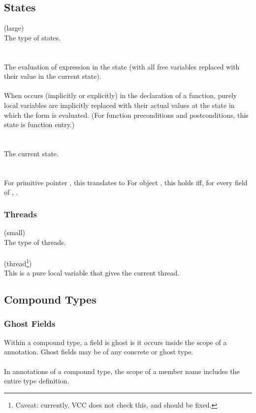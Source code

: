 \documentclass[preprint,nocopyrightspace]{sigplanconf}
\begin{document}
{{{\subsection{States}
\vcc{\state} (large)\\
The type of states. 
\\\\
\\
The evaluation of expression  in the state  (with all
free variables replaced with their value in the current state).  
\\\\
When \vcc{\at} occurs (implicitly or explicitly) in the declaration of
a function, purely local variables are implicitly replaced with their
actual values at the state in which the form is evaluated. (For
function preconditions and postconditions, this state is function entry.)
\\\\
\vcc{\state \now()}\\
The current state. 
\\\\
\\
For primitive pointer , this translates to  
For object , this holds iff, for every field 
of , .

\subsubsection{Threads}
\vcc{\thread} (small) \\
The type of threads. 
\\\\
 (thread\footnote{Caveat: currently, VCC does
not check this, and should be fixed.})\\
This is a pure local variable that gives the current
thread. 

\subsection{Compound Types}
 
\subsubsection{Ghost Fields}
Within a compound type, a field is ghost is it occurs inside the scope
of a   annotation. Ghost fields may be of any concrete
or ghost type. 
\\\\
In annotations of a compound type, the scope of a member name includes
the entire type definition.

}}}
\end{document}
